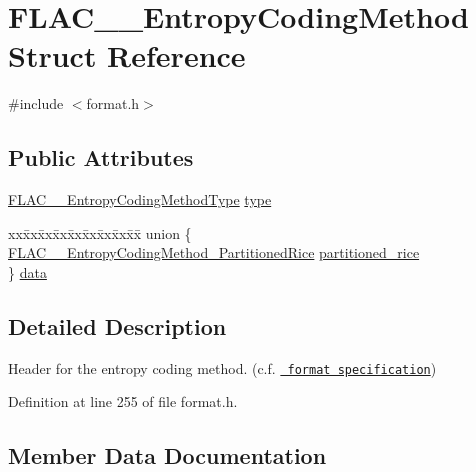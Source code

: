 \hypertarget{struct_f_l_a_c_____entropy_coding_method}{}\section{F\+L\+A\+C\+\_\+\+\_\+\+Entropy\+Coding\+Method Struct Reference}
\label{struct_f_l_a_c_____entropy_coding_method}


{\ttfamily \#include $<$format.\+h$>$}

\subsection*{Public Attributes}
\begin{DoxyCompactItemize}
\item 
\mbox{\hyperlink{group__flac__format_ga951733d2ea01943514290012cd622d3a}{F\+L\+A\+C\+\_\+\+\_\+\+Entropy\+Coding\+Method\+Type}} \mbox{\hyperlink{struct_f_l_a_c_____entropy_coding_method_abe41e84858fd130777b7cc3c27e400f8}{type}}
\item 
\begin{tabbing}
xx\=xx\=xx\=xx\=xx\=xx\=xx\=xx\=xx\=\kill
union \{\\
\>\mbox{\hyperlink{struct_f_l_a_c_____entropy_coding_method___partitioned_rice}{FLAC\_\_EntropyCodingMethod\_PartitionedRice}} \mbox{\hyperlink{struct_f_l_a_c_____entropy_coding_method_a41d493a19d5c01ec7a06a5b3d83adf8b}{partitioned\_rice}}\\
\} \mbox{\hyperlink{struct_f_l_a_c_____entropy_coding_method_a55f751b4b40cc7cf500de6fb6291dd1d}{data}}\\

\end{tabbing}\end{DoxyCompactItemize}


\subsection{Detailed Description}
Header for the entropy coding method. (c.\+f. \href{../format.html\#residual}{\texttt{ format specification}}) 

Definition at line 255 of file format.\+h.



\subsection{Member Data Documentation}
\mbox{\label{struct_f_l_a_c_____entropy_coding_method_a55f751b4b40cc7cf500de6fb6291dd1d}} 

